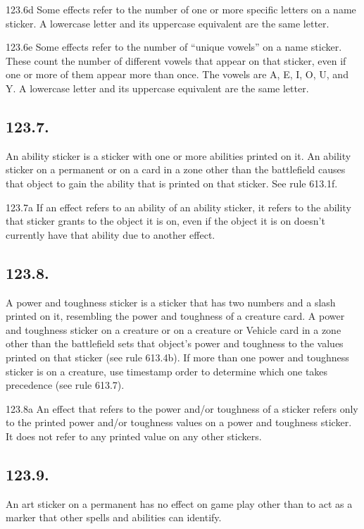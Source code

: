 123.6d Some effects refer to the number of one or more specific letters on a name sticker. A lowercase letter and its uppercase equivalent are the same letter.

123.6e Some effects refer to the number of “unique vowels” on a name sticker. These count the number of different vowels that appear on that sticker, even if one or more of them appear more than once. The vowels are A, E, I, O, U, and Y. A lowercase letter and its uppercase equivalent are the same letter.

\subsection*{123.7.}
An ability sticker is a sticker with one or more abilities printed on it. An ability sticker on a permanent or on a card in a zone other than the battlefield causes that object to gain the ability that is printed on that sticker. See rule 613.1f.

123.7a If an effect refers to an ability of an ability sticker, it refers to the ability that sticker grants to the object it is on, even if the object it is on doesn’t currently have that ability due to another effect.

\subsection*{123.8.}
A power and toughness sticker is a sticker that has two numbers and a slash printed on it, resembling the power and toughness of a creature card. A power and toughness sticker on a creature or on a creature or Vehicle card in a zone other than the battlefield sets that object’s power and toughness to the values printed on that sticker (see rule 613.4b). If more than one power and toughness sticker is on a creature, use timestamp order to determine which one takes precedence (see rule 613.7).

123.8a An effect that refers to the power and/or toughness of a sticker refers only to the printed power and/or toughness values on a power and toughness sticker. It does not refer to any printed value on any other stickers.

\subsection*{123.9.}
An art sticker on a permanent has no effect on game play other than to act as a marker that other spells and abilities can identify.

